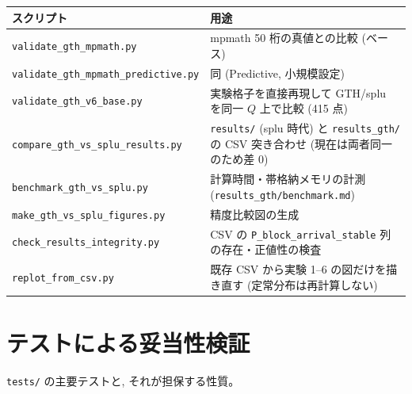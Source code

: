 \documentclass[a4paper,11pt]{article}
\newcommand{\code}[1]{\texttt{#1}}
\begin{document}
\begin{center}
\begin{tabular}{ll}
\toprule
スクリプト & 用途 \\
\midrule
\code{validate\_gth\_mpmath.py} & mpmath 50 桁の真値との比較 (ベース) \\
\code{validate\_gth\_mpmath\_predictive.py} & 同 (Predictive, 小規模設定) \\
\code{validate\_gth\_v6\_base.py} & 実験格子を直接再現して GTH/splu を同一 $Q$ 上で比較 (415 点) \\
\code{compare\_gth\_vs\_splu\_results.py} & \code{results/} (splu 時代) と \code{results\_gth/} の CSV 突き合わせ (現在は両者同一のため差 0) \\
\code{benchmark\_gth\_vs\_splu.py} & 計算時間・帯格納メモリの計測 (\code{results\_gth/benchmark.md}) \\
\code{make\_gth\_vs\_splu\_figures.py} & 精度比較図の生成 \\
\code{check\_results\_integrity.py} & CSV の \code{P\_block\_arrival\_stable} 列の存在・正値性の検査 \\
\code{replot\_from\_csv.py} & 既存 CSV から実験 1--6 の図だけを描き直す (定常分布は再計算しない) \\
\bottomrule
\end{tabular}
\end{center}

\section{テストによる妥当性検証}

\code{tests/} の主要テストと, それが担保する性質。
\end{document}
